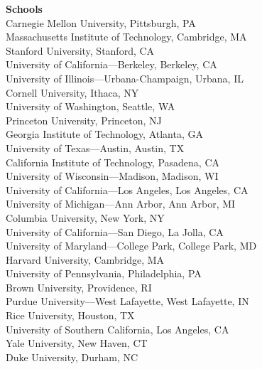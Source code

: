 \documentclass[a4paper,11pt]{article} %
\begin{document}
\textbf{Schools} \\
Carnegie Mellon University, Pittsburgh, PA\\
Massachusetts Institute of Technology, Cambridge, MA\\
Stanford University, Stanford, CA\\
University of California—Berkeley, Berkeley, CA\\
University of Illinois—Urbana-Champaign, Urbana, IL\\
Cornell University, Ithaca, NY\\
University of Washington, Seattle, WA\\
Princeton University, Princeton, NJ\\
Georgia Institute of Technology, Atlanta, GA\\
University of Texas—Austin, Austin, TX\\
California Institute of Technology, Pasadena, CA\\
University of Wisconsin—Madison, Madison, WI\\
University of California—Los Angeles, Los Angeles, CA\\
University of Michigan—Ann Arbor, Ann Arbor, MI\\
Columbia University, New York, NY\\
University of California—San Diego, La Jolla, CA\\
University of Maryland—College Park, College Park, MD\\
Harvard University, Cambridge, MA\\
University of Pennsylvania, Philadelphia, PA\\
Brown University, Providence, RI\\
Purdue University—West Lafayette, West Lafayette, IN\\
Rice University, Houston, TX\\
University of Southern California, Los Angeles, CA\\
Yale University, New Haven, CT\\
Duke University, Durham, NC\\
\end{document}
